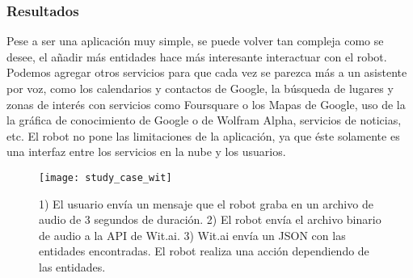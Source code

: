 
\subsubsection{Resultados}

Pese a ser una aplicación muy simple,
se puede volver tan compleja como se desee,
el añadir más entidades hace más interesante interactuar con el
robot. Podemos agregar otros servicios para
que cada vez se parezca más a un asistente por voz,
como los calendarios y contactos de Google, la búsqueda de lugares y
zonas de interés con servicios como Foursquare o los Mapas de Google,
uso de la la gráfica de conocimiento de Google o de Wolfram Alpha, 
servicios de noticias, etc. El robot no pone las limitaciones 
de la aplicación, ya que éste solamente es una interfaz
entre los servicios en la nube y los usuarios.

\begin{figure}[H]
\centering
\caption{1) El usuario envía un mensaje que el robot graba en un archivo de audio de 3 segundos de duración. 2) El robot envía el archivo binario de audio
a la API de Wit.ai. 3) Wit.ai envía un JSON con las entidades encontradas. El robot realiza una acción dependiendo de las entidades.}
\texttt{[image: study\_case\_wit]}
\end{figure}

